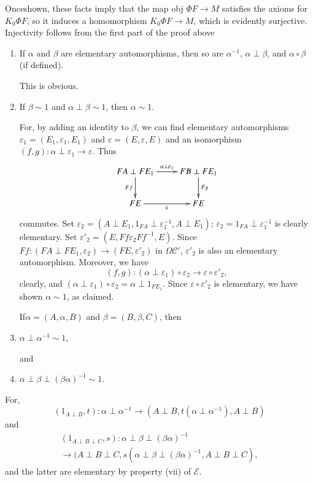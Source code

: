 Once\pageoriginale shown, these facts imply that the map obj $\Phi F \to M$
satisfies the axioms for $K_0 \Phi F$, so it induces a homomorphism
$K_0 \Phi F \to M$, which is evidently surjective. Injectivity follows
from the first part of the proof above  
\begin{enumerate}[(1)]
\item If $\alpha$ and $\beta$ are elementary automorphisms, then so
  are $\alpha^{-1}$, $\alpha \perp \beta$, and $\alpha \circ \beta$ (if
  defined). 

This is obvious.

\item If $\beta \sim 1$ and $ \alpha \perp \beta \sim 1$, then $\alpha
  \sim 1$. 

For, by adding an identity to $\beta$, we can find elementary
automorphisms $\varepsilon_1 = (E_1, \varepsilon_1, E_1)$ and
$\varepsilon = (E, \varepsilon, E)$ and an isomorphism $(f, g) :
\alpha \perp \varepsilon_1 \to \varepsilon $. Thus  
\[
\xymatrix{
FA \perp FE_1 \ar[r]^{\alpha \perp \varepsilon_1} \ar[d]_{Ff} & FB
\perp FE_1 \ar[d]^{Fg}\\
FE \ar[r]_{\varepsilon} & FE
}
\]
commutes. Set $\varepsilon_2 = (A \perp E_1, 1_{FA} \perp
\varepsilon^{-1}_1, A \perp E_1)$; $\varepsilon_2 = 1_{FA} \perp
\varepsilon^{-1}_1$ is clearly elementary. Set $\varepsilon'_2 = (E,
Ff \varepsilon_2 Ff^{-1}, E)$. Since $Ff : (FA \perp FE_1,
\varepsilon_2) \to (FE, \varepsilon'_2)$ in $\Omega \mathscr{C}'$,
$\varepsilon'_2$ is also an elementary automorphism. Moreover, we have   
$$
(f, g) : (\alpha \perp \varepsilon_1) \circ \varepsilon_2 \to \varepsilon
\circ \varepsilon'_2, 
$$
clearly, and $(\alpha \perp \varepsilon_1) \circ \varepsilon_2 = \alpha
\perp 1_{FE_1}$. Since $\varepsilon \circ \varepsilon'_2$ is elementary,
we have shown $\alpha \sim 1$, as claimed. 

If\pageoriginale $\alpha = (A, \alpha, B)$ and $\beta = (B, \beta, C)$, then  

\setcounter{enumi}{3}
\item $\alpha \perp \alpha^{-1} \sim 1$,

and 

\item $\alpha \perp \beta \perp (\beta \alpha)^{-1} \sim 1$.
\end{enumerate}

For,
$$
(1_{A \perp B}, t) : \alpha \perp \alpha^{-1} \to (A \perp B, t(\alpha
\perp \alpha^{-1}), A \perp B) 
$$
and 
\begin{gather*}
(1_{A \perp B \perp C},s) : \alpha \perp \beta \perp (\beta
\alpha)^{-1}\\ 
\to (A \perp B \perp C, s(\alpha \perp \beta \perp (\beta
\alpha)^{-1}, A \perp B \perp C), 
\end{gather*}
and the latter are elementary by property (vii) of $\mathscr{E}$.

